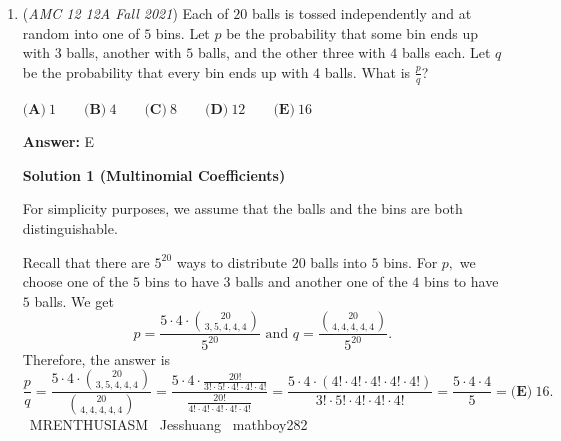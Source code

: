 \begin{enumerate}
 $\textbf{Case 3: b=3}$$\to$ This gives $9\leq 4c$ and $c^2\leq 12$, so $c$ can only equal $3$, giving $\textbf{1}$ case.

 $\textbf{Case 4: b=4}$$\to$ This gives $16\leq 4c$ and $c^2\leq 16$, so $c$ can only equal $4$, giving $\textbf{1}$ case.

 For any value of $b$ larger than $4$, there are no real solutions to the inequalities (one can deduce this by testing $b=5$, $b=6$, etc.)

 Thus, our final answer is $2+2+1+1=\boxed{\textbf{(B) } 6}$ ordered pairs.

 \begin{verbatim}
Note: This link’s to a different problem. I can't find OmegaLearn's solution to this problem in the video.
\end{verbatim}




	\item (\textit{AMC 12 12A Fall 2021}) Each of $20$ balls is tossed independently and at random into one of $5$ bins. Let $p$ be the probability that some bin ends up with $3$ balls, another with $5$ balls, and the other three with $4$ balls each. Let $q$ be the probability that every bin ends up with $4$ balls. What is $\frac{p}{q}$?


 $\textbf{(A)}\ 1 \qquad\textbf{(B)}\  4 \qquad\textbf{(C)}\  8 \qquad\textbf{(D)}\  12 \qquad\textbf{(E)}\ 16$

 \textbf{Answer: }E



\textbf{Solution 1 (Multinomial Coefficients)}

For simplicity purposes, we assume that the balls and the bins are both distinguishable.

 Recall that there are $5^{20}$ ways to distribute $20$ balls into $5$ bins. For $p,$ we choose one of the $5$ bins to have $3$ balls and another one of the $4$ bins to have $5$ balls. We get
 \[p=\frac{5\cdot4\cdot\binom{20}{3,5,4,4,4}}{5^{20}} \text{ and } q=\frac{\binom{20}{4,4,4,4,4}}{5^{20}}.\] Therefore, the answer is 
 \[\frac pq=\frac{5\cdot4\cdot\binom{20}{3,5,4,4,4}}{\binom{20}{4,4,4,4,4}}=\frac{5\cdot4\cdot\frac{20!}{3!\cdot5!\cdot4!\cdot4!\cdot4!}}{\frac{20!}{4!\cdot4!\cdot4!\cdot4!\cdot4!}}=\frac{5\cdot4\cdot(4!\cdot4!\cdot4!\cdot4!\cdot4!)}{3!\cdot5!\cdot4!\cdot4!\cdot4!}=\frac{5\cdot4\cdot4}{5}=\boxed{\textbf{(E)}\ 16}.\]~MRENTHUSIASM ~Jesshuang ~mathboy282

 




\end{enumerate}
